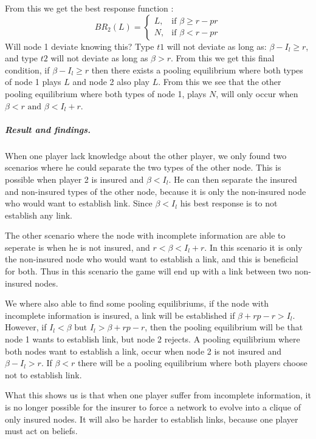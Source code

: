 From this we get the best response function :
\begin{equation}
BR_{2}(L)=
\begin{cases}
	L,& \text{if } \beta\geq r-pr\\
   N,& \text{if } \beta<r-pr  
\end{cases}
\end{equation}
Will node 1 deviate knowing this?
Type $t1$ will not deviate as long as: $\beta - I_{l} \geq r$, and type $t2$ will not deviate as long as $\beta >r$.
From this we get this final condition, if $\beta-I_{l}\geq r$ then there exists a pooling equilibrium where both types of node 1 plays $L$ and node 2 also play $L$.
From this we see that the other pooling equilibrium where both types of node 1, plays $N$, will only occur when $\beta<r \text{ and } \beta<I_l+r$.

\subparagraph{Result and findings.}
When one player lack knowledge about the other player, we only found two scenarios where he could separate the two types of the other node. This is possible when player 2 is insured and $\beta<I_{l}$. He can then separate the insured and non-insured types of the other node, because it is only the non-insured node who would want to establish link. Since $\beta<I_{l}$ his best response is to not establish any link.

The other scenario where the node with incomplete information are able to seperate is when he is not insured, and $r<\beta<I_{l}+r$. In this scenario it is only the non-insured node who would want to establish a link, and this is beneficial for both. Thus in this scenario the game will end up with a link between two non-insured nodes.


We where also able to find some pooling equilibriums, if the node with incomplete information is insured, a link will be established if $\beta+rp-r>I_{l}$. However, if $I_{l}<\beta \text{ but } I_{l}>\beta+rp-r$, then the pooling equilibrium will be that node 1 wants to establish link, but node 2 rejects.
A pooling equilibrium where both nodes want to establish a link, occur when node 2 is not insured and $\beta-I_{l}>r$. If $\beta<r$ there will be a pooling equilibrium where both players choose not to establish link. 

What this shows us is that when one player suffer from incomplete information, it is no longer possible for the insurer to force a network to evolve into a clique of only insured nodes. It will also be harder to establish links, because one player must act on beliefs.  
